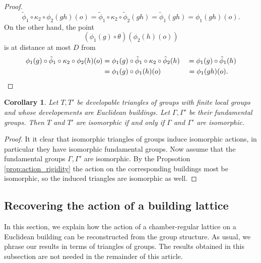 \documentclass[dvipsnames]{article}
\newtheorem{corollary}[theorem]{Corollary}
\theoremstyle{definition}
\theoremstyle{remark}
\begin{document}
\begin{proof}
        \[
            \tilde \phi_1 \circ \kappa_2 \circ \phi_2(gh)(o)
            = \tilde \phi_1\circ \kappa_2 \circ \tilde \phi_2(gh) 
            = \tilde \phi_1 (gh)
            = \phi_1(gh)(o).
        \]
        On the other hand, the point
        \[
            (\phi_1(g) \circ \theta)(\phi_2(h)(o))
        \]
        is at distance at most $D$ from 
        \begin{align*}
            \phi_1(g) \circ \tilde \phi_1 \circ \kappa_2 \circ \phi_2(h) (o)
            &= \phi_1(g) \circ \tilde \phi_1 \circ \kappa_2 \circ \tilde \phi_2(h)
            &&= \phi_1(g) \circ \tilde \phi_1(h) \\
            &= \phi_1(g) \circ \phi_1(h)(o)
            &&\hspace{0.2mm}= \phi_1(gh)(o).
        \end{align*}
    \end{proof}

    \begin{corollary}\label{cor:group_gives_triangles}
        Let $T, T'$ be developable triangles of groups with finite local groups and whose developements are Euclidean buildings.
        Let $\Gamma, \Gamma'$ be their fundamental groups. Then $T$ and $T'$ are isomorphic if and only if $\Gamma$ and $\Gamma'$ are isomorphic.
    \end{corollary}

    \begin{proof}
        It it clear that isomorphic triangles of groups induce isomorphic actions, in particular they have isomorphic fundamental groups.
        Now assume that the fundamental groups $\Gamma, \Gamma'$ are isomorphic. By the Propsotion \ref{prop:action_rigidity} the action on the corresponding buildings most be isomorphic, so the induced triangles are isomorphic as well.   
    \end{proof}

    \subsection{Recovering the action of a building lattice}

    In this section, we explain how the action of a chamber-regular lattice on a Euclidean building can be reconstructed from the group structure. As usual, we phrase our results in terms of triangles of groups.
    The results obtained in this subsection are not needed in the remainder of this article.
\end{document}
